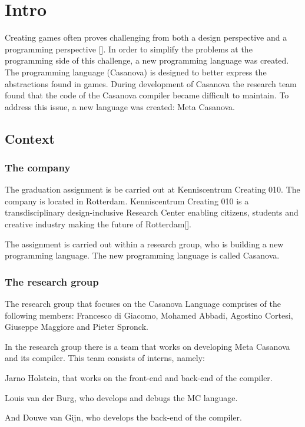\section{Intro}

Creating games often proves challenging from both a design perspective and a programming perspective []. 
In order to simplify the problems at the programming side of this challenge, a new programming language was created. 
The programming language (Casanova) is designed to better express the abstractions found in games. 
During development of Casanova the research team found that the code of the Casanova compiler became difficult to maintain. 
To address this issue, a new language was created: Meta Casanova.

\subsection{Context}

\subsubsection {The company}

The graduation assignment is be carried out at Kenniscentrum Creating 010. 
The company is located in Rotterdam. Kenniscentrum Creating 010 is a transdisciplinary design-inclusive Research Center enabling citizens, 
students and creative industry making the future of Rotterdam[].

The assignment is carried out within a research group, who is building a new programming language. 
The new programming language is called Casanova.

\subsubsection {The research group}

The research group that focuses on the Casanova Language comprises of the following members: 
Francesco di Giacomo, Mohamed Abbadi, Agostino Cortesi, Giuseppe Maggiore and Pieter Spronck.

In the research group there is a team that works on developing Meta Casanova and its compiler. This team consists of interns, namely:

Jarno Holstein, that works on the front-end and back-end of the compiler.

Louis van der Burg, who develops and debugs the MC language.

And Douwe van Gijn, who develops the back-end of the compiler.

